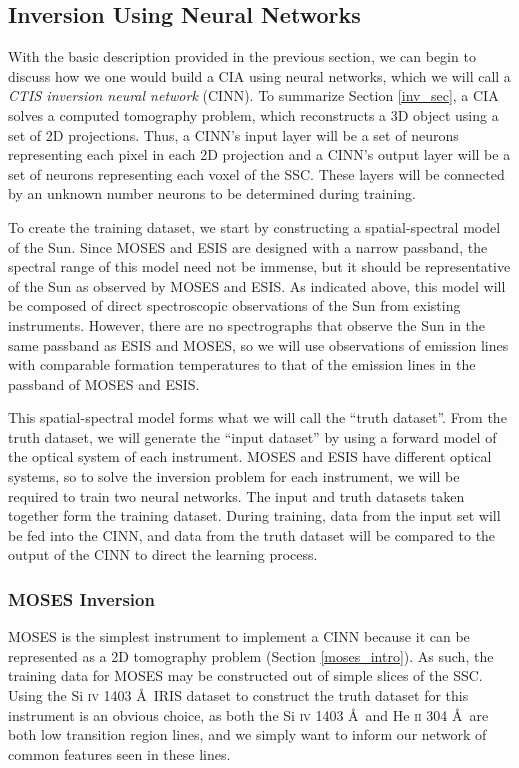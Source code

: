 \documentclass[10pt, letter]{article}
\begin{document}
		\subsection{Inversion Using Neural Networks}
		
			With the basic description provided in the previous section, we can begin to discuss how we one would build a CIA using neural networks, which we will call a \textit{CTIS inversion neural network} (CINN). To summarize Section \ref{inv_sec}, a CIA solves a computed tomography problem, which reconstructs a 3D object using a set of 2D projections. Thus, a CINN's input layer will be a set of neurons representing each pixel in each 2D projection and a CINN's output layer will be a set of neurons representing each voxel of the SSC. These layers will be connected by an unknown number neurons to be determined during training. 
					
			To create the training dataset, we start by constructing a spatial-spectral model of the Sun. Since MOSES and ESIS are designed with a narrow passband, the spectral range of this model need not be immense, but it should be representative of the Sun as observed by MOSES and ESIS. As indicated above, this model will be composed of direct spectroscopic observations of the Sun from existing instruments. However, there are no spectrographs that observe the Sun in the same passband as ESIS and MOSES, so we will use observations of emission lines with comparable formation temperatures to that of the emission lines in the passband of MOSES and ESIS. 
			
			This spatial-spectral model forms what we will call the ``truth dataset''. From the truth dataset, we will generate the ``input dataset'' by using a forward model of the optical system of each instrument. MOSES and ESIS have different optical systems, so to solve the inversion problem for each instrument, we will be required to train two neural networks. The input and truth datasets taken together form the training dataset. During training, data from the input set will be fed into the CINN, and data from the truth dataset will be compared to the output of the CINN to direct the learning process.
			
			\subsubsection{MOSES Inversion} \label{moses_inv}
			
				MOSES is the simplest instrument to implement a CINN because it can be represented as a 2D tomography problem (Section \ref{moses_intro}). As such, the training data for MOSES may be constructed out of simple slices of the SSC. Using the Si \textsc{iv} 1403 \AA\ IRIS dataset to construct the truth dataset for this instrument is an obvious choice, as both the Si \textsc{iv} 1403 \AA\ and He \textsc{ii} 304 \AA\ are both low transition region lines, and we simply want to inform our network of common features seen in these lines.
		
\end{document}
